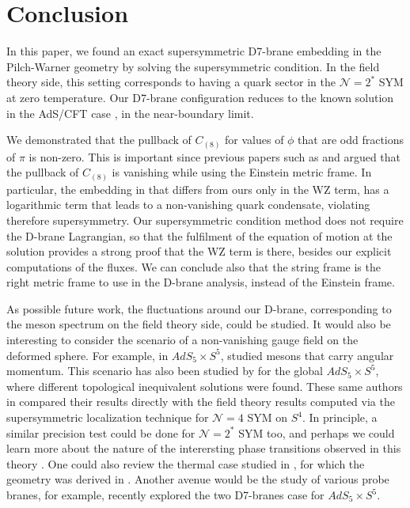 \section{Conclusion}

In this paper, we found an exact supersymmetric D7-brane embedding in the Pilch-Warner geometry by solving the supersymmetric condition. In the field theory side, this setting corresponds to having a quark sector in the $\mathcal{N}=2^*$ SYM at zero temperature. Our D7-brane configuration reduces to the known solution in the AdS/CFT case \cite{Karch:2005ms}, in the near-boundary limit. 

We demonstrated that the pullback of $C_{(8)}$ for values of $\phi$ that are odd fractions of $\pi$ is non-zero. This is important since previous papers such as \cite{Albash:2011nw} and \cite{Evans:2005ti} argued that the pullback of $C_{(8)}$ is vanishing while using the Einstein metric frame. In particular, the embedding in \cite{Albash:2011nw} that differs from ours only in the WZ term, has a logarithmic term that leads to a non-vanishing quark condensate, violating therefore supersymmetry. Our supersymmetric condition method does not require the D-brane Lagrangian, so that the fulfilment of the equation of motion at the solution provides a strong proof that the WZ term is there, besides our explicit computations of the fluxes. We can conclude also that the string frame is the right metric frame to use in the D-brane analysis, instead of the Einstein frame. 

As possible future work, the fluctuations around our D-brane, corresponding to the meson spectrum on the field theory side, could be studied. It would also be interesting to consider the scenario of a non-vanishing gauge field on the deformed sphere. For example, in $AdS_5 \times S^5$, \cite{Kruczenski:2003be} studied mesons that carry angular momentum. This scenario has also been studied by \cite{Karch:2015vra} for the global $AdS_5 \times S^5$, where different topological inequivalent solutions were found. These same authors in \cite{Karch:2015kfa} compared their results directly with the field theory results computed via the supersymmetric localization technique \cite{Pestun:2007rz} for $\mathcal{N}=4$ SYM on $S^4$. In principle, a similar precision test could be done for $\mathcal{N}=2^*$ SYM too, and perhaps we could learn more about the nature of the interersting phase transitions observed in this theory \cite{Russo:2013qaa, Zarembo:2014ooa, Chen:2014vka}. One could also review the thermal case studied in \cite{Albash:2011dq}, for which the geometry was derived in \cite{Buchel:2003ah}. Another avenue would be the study of various probe branes, for example, \cite{Faedo:2019jlp} recently explored the two D7-branes case for $AdS_5 \times S^5$.



